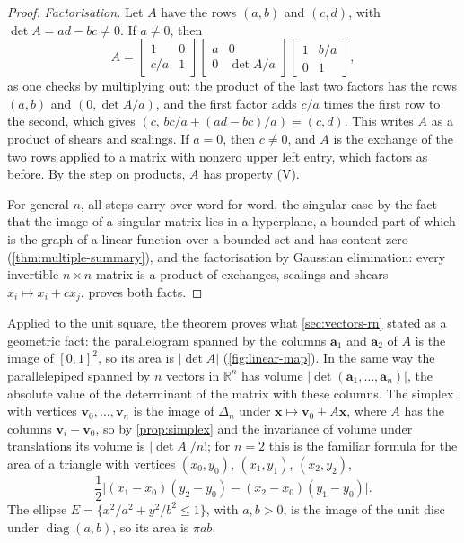 \begin{proof}
\emph{Factorisation.} Let $A$ have the rows $(a,b)$ and $(c,d)$, with $\det A=ad-bc\ne0$. If $a\ne0$, then
\[
A=\begin{bmatrix}1&0\\c/a&1\end{bmatrix}\begin{bmatrix}a&0\\0&\det A/a\end{bmatrix}\begin{bmatrix}1&b/a\\0&1\end{bmatrix},
\]
as one checks by multiplying out: the product of the last two factors has the rows $(a,b)$ and $(0,\det A/a)$, and the first factor adds $c/a$ times the first row to the second, which gives $(c,\,bc/a+(ad-bc)/a)=(c,d)$. This writes $A$ as a product of shears and scalings. If $a=0$, then $c\ne0$, and $A$ is the exchange of the two rows applied to a matrix with nonzero upper left entry, which factors as before. By the step on products, $A$ has property (V).

For general $n$, all steps carry over word for word, the singular case by the fact that the image of a singular matrix lies in a hyperplane, a bounded part of which is the graph of a linear function over a bounded set and has content zero (\cref{thm:multiple-summary}), and the factorisation by Gaussian elimination: every invertible $n\times n$ matrix is a product of exchanges, scalings and shears $x_i\mapsto x_i+cx_j$.  proves both facts.
\end{proof}

Applied to the unit square, the theorem proves what \cref{sec:vectors-rn} stated as a geometric fact: the parallelogram spanned by the columns $\mathbf a_1$ and $\mathbf a_2$ of $A$ is the image of $[0,1]^2$, so its area is $|\det A|$ (\cref{fig:linear-map}). In the same way the parallelepiped spanned by $n$ vectors in $\mathbb R^n$ has volume $|\det(\mathbf a_1,\ldots,\mathbf a_n)|$, the absolute value of the determinant of the matrix with these columns. The simplex with vertices $\mathbf v_0,\ldots,\mathbf v_n$ is the image of $\Delta_n$ under $\mathbf x\mapsto\mathbf v_0+A\mathbf x$, where $A$ has the columns $\mathbf v_i-\mathbf v_0$, so by \cref{prop:simplex} and the invariance of volume under translations its volume is $|\det A|/n!$; for $n=2$ this is the familiar formula for the area of a triangle with vertices $(x_0,y_0)$, $(x_1,y_1)$, $(x_2,y_2)$,
\[
\frac12\bigl|(x_1-x_0)(y_2-y_0)-(x_2-x_0)(y_1-y_0)\bigr| .
\]
The ellipse $E=\{x^2/a^2+y^2/b^2\le1\}$, with $a,b>0$, is the image of the unit disc under $\operatorname{diag}(a,b)$, so its area is $\pi ab$.

